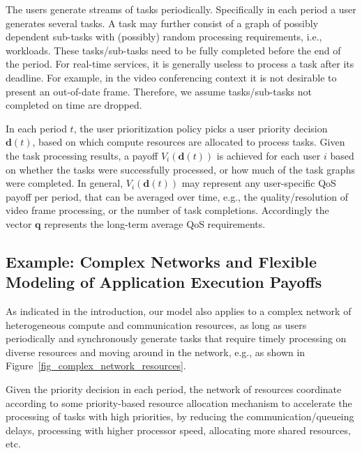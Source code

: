 \documentclass[prodmode,acmtompecs]{acmsmall}
\newcommand{\reqvec}{\mathbf{q}}
\newcommand{\myComments}[1]{}
\newif\ifdissertation
\newcommand{\dissertationStart}{\ifdissertation  \myComments{Dissertation version: }}
\newcommand{\commentEnd}{\myComments{End}}
\begin{document}
The users generate streams of tasks periodically. Specifically in each period a user generates several tasks. A task may further consist of a graph of possibly dependent sub-tasks with (possibly) random processing requirements, i.e., workloads. These tasks/sub-tasks need to be fully completed before the end of the period. 
For real-time services, it is generally useless to process a task after its deadline. For example, in the video conferencing context it is not desirable to present an out-of-date frame.  Therefore, we assume tasks/sub-tasks not completed on time are dropped. 

In each period $t$, the user prioritization policy picks a user priority decision $\mathbf{d}(t)$, based on which compute resources are allocated to process tasks. 
Given the task processing results, a payoff $V_i(\mathbf{d}(t))$ is achieved for each user $i$ based on whether the tasks were successfully processed, or how much of the task graphs were completed. 
In general, $V_i(\mathbf{d}(t))$ may represent any user-specific QoS payoff per period, that can be averaged over time, e.g., the quality/resolution of video frame processing, or the number of task completions. Accordingly the vector $\reqvec$ represents the long-term average QoS requirements. 

\dissertationStart
Note that these payoff vectors depend heavily on the internal design of the system and in this paper we assume the internal design is fixed and has been carefully optimized by the computing system architect. 
In practice, it may be challenging to jointly optimize the internal design and the stationary priority scheduling policy to provide the best QoS to users. 
A discussion of different internal designs in a specific computing system model is provided in [?]. 
\commentEnd\fi

\subsection{Example: Complex Networks and Flexible Modeling of Application Execution Payoffs}
As indicated in the introduction, our model also applies to a complex network of heterogeneous compute and communication resources, as long as users periodically and synchronously generate tasks that require timely processing on diverse resources and moving around in the network, e.g., as shown in Figure~\ref{fig_complex_network_resources}. 

Given the priority decision in each period, the network of resources coordinate according to some priority-based resource allocation mechanism to accelerate the processing of tasks with high priorities, by reducing the communication/queueing delays, processing with higher processor speed, allocating more shared resources, etc. 
\end{document}
